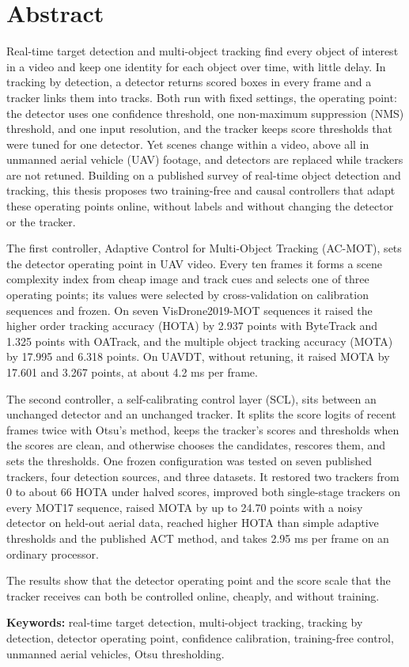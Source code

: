 \chapter*{Abstract}

Real-time target detection and multi-object tracking find every object of interest in a video and keep one identity for each object over time, with little delay. In tracking by detection, a detector returns scored boxes in every frame and a tracker links them into tracks. Both run with fixed settings, the operating point: the detector uses one confidence threshold, one non-maximum suppression (NMS) threshold, and one input resolution, and the tracker keeps score thresholds that were tuned for one detector. Yet scenes change within a video, above all in unmanned aerial vehicle (UAV) footage, and detectors are replaced while trackers are not retuned. Building on a published survey of real-time object detection and tracking, this thesis proposes two training-free and causal controllers that adapt these operating points online, without labels and without changing the detector or the tracker.

The first controller, Adaptive Control for Multi-Object Tracking (AC-MOT), sets the detector operating point in UAV video. Every ten frames it forms a scene complexity index from cheap image and track cues and selects one of three operating points; its values were selected by cross-validation on calibration sequences and frozen. On seven VisDrone2019-MOT sequences it raised the higher order tracking accuracy (HOTA) by 2.937 points with ByteTrack and 1.325 points with OATrack, and the multiple object tracking accuracy (MOTA) by 17.995 and 6.318 points. On UAVDT, without retuning, it raised MOTA by 17.601 and 3.267 points, at about 4.2 ms per frame.

The second controller, a self-calibrating control layer (SCL), sits between an unchanged detector and an unchanged tracker. It splits the score logits of recent frames twice with Otsu's method, keeps the tracker's scores and thresholds when the scores are clean, and otherwise chooses the candidates, rescores them, and sets the thresholds. One frozen configuration was tested on seven published trackers, four detection sources, and three datasets. It restored two trackers from 0 to about 66 HOTA under halved scores, improved both single-stage trackers on every MOT17 sequence, raised MOTA by up to 24.70 points with a noisy detector on held-out aerial data, reached higher HOTA than simple adaptive thresholds and the published ACT method, and takes 2.95 ms per frame on an ordinary processor.

The results show that the detector operating point and the score scale that the tracker receives can both be controlled online, cheaply, and without training.

\vspace{0.5cm}
\noindent\textbf{Keywords:} real-time target detection, multi-object tracking, tracking by detection, detector operating point, confidence calibration, training-free control, unmanned aerial vehicles, Otsu thresholding.
